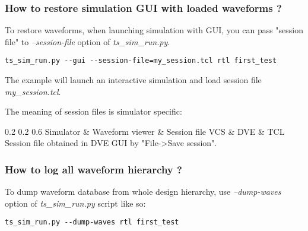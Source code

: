 \documentclass{tropic_design_spec}
\begin{document}
\subsubsection{How to restore simulation GUI with loaded waveforms ?}
\label{sec:how-to-restore-simulation-gui-with-loaded-waveforms}

To restore waveforms, when launching simulation with GUI, you can pass "session file"
to \textit{--session-file} option of \textit{ts_sim_run.py}.

\begin{lstlisting}
ts_sim_run.py --gui --session-file=my_session.tcl rtl first_test
\end{lstlisting}

The example will launch an interactive simulation and load session file \textit{my_session.tcl}.

The meaning of session files is simulator specific:

\begin{TropicRatioTable3Col}
    {0.2}             {0.2}               {0.6}
	{Simulator 	    & Waveform viewer 	& Session file}
        VCS         & DVE               & TCL Session file obtained in DVE GUI by "File->Save session". \Ttlb
\end{TropicRatioTable3Col}


\subsubsection{How to log all waveform hierarchy ?}
\label{sec:how-to-log-all-waveform-hierarchy}

To dump waveform database from whole design hierarchy, use \textit{--dump-waves}
option of \textit{ts_sim_run.py} script like so:

\begin{lstlisting}
ts_sim_run.py --dump-waves rtl first_test
\end{lstlisting}


\end{document}
